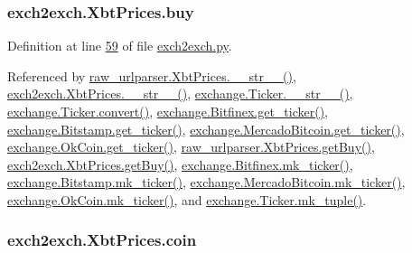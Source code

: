 \subsubsection[{\texorpdfstring{buy}{buy}}]{\setlength{\rightskip}{0pt plus 5cm}exch2exch.\+Xbt\+Prices.\+buy}\hypertarget{classexch2exch_1_1_xbt_prices_a8f1d8ac0ef114ea3645314578697b7ac}{}\label{classexch2exch_1_1_xbt_prices_a8f1d8ac0ef114ea3645314578697b7ac}


Definition at line \hyperlink{exch2exch_8py_source_l00059}{59} of file \hyperlink{exch2exch_8py_source}{exch2exch.\+py}.



Referenced by \hyperlink{raw__urlparser_8py_source_l00074}{raw\+\_\+urlparser.\+Xbt\+Prices.\+\_\+\+\_\+str\+\_\+\+\_\+()}, \hyperlink{exch2exch_8py_source_l00091}{exch2exch.\+Xbt\+Prices.\+\_\+\+\_\+str\+\_\+\+\_\+()}, \hyperlink{exchange_8py_source_l00111}{exchange.\+Ticker.\+\_\+\+\_\+str\+\_\+\+\_\+()}, \hyperlink{exchange_8py_source_l00065}{exchange.\+Ticker.\+convert()}, \hyperlink{exchange_8py_source_l00332}{exchange.\+Bitfinex.\+get\+\_\+ticker()}, \hyperlink{exchange_8py_source_l00401}{exchange.\+Bitstamp.\+get\+\_\+ticker()}, \hyperlink{exchange_8py_source_l00535}{exchange.\+Mercado\+Bitcoin.\+get\+\_\+ticker()}, \hyperlink{exchange_8py_source_l00600}{exchange.\+Ok\+Coin.\+get\+\_\+ticker()}, \hyperlink{raw__urlparser_8py_source_l00062}{raw\+\_\+urlparser.\+Xbt\+Prices.\+get\+Buy()}, \hyperlink{exch2exch_8py_source_l00070}{exch2exch.\+Xbt\+Prices.\+get\+Buy()}, \hyperlink{exchange_8py_source_l00346}{exchange.\+Bitfinex.\+mk\+\_\+ticker()}, \hyperlink{exchange_8py_source_l00415}{exchange.\+Bitstamp.\+mk\+\_\+ticker()}, \hyperlink{exchange_8py_source_l00549}{exchange.\+Mercado\+Bitcoin.\+mk\+\_\+ticker()}, \hyperlink{exchange_8py_source_l00614}{exchange.\+Ok\+Coin.\+mk\+\_\+ticker()}, and \hyperlink{exchange_8py_source_l00096}{exchange.\+Ticker.\+mk\+\_\+tuple()}.

\subsubsection[{\texorpdfstring{coin}{coin}}]{\setlength{\rightskip}{0pt plus 5cm}exch2exch.\+Xbt\+Prices.\+coin}\hypertarget{classexch2exch_1_1_xbt_prices_a1191c8825e8f1333b4100b89fa2be053}{}\label{classexch2exch_1_1_xbt_prices_a1191c8825e8f1333b4100b89fa2be053}


